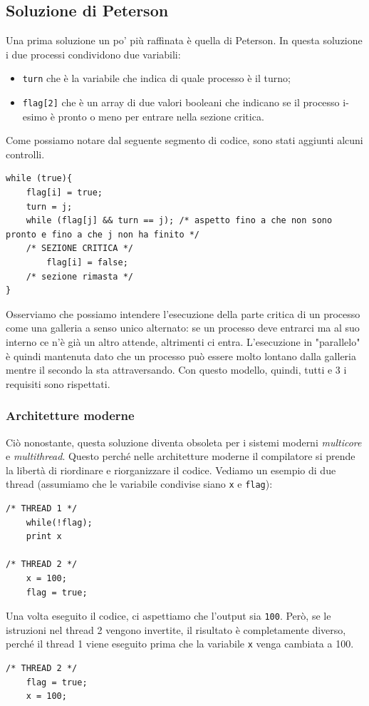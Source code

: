 \subsection{Soluzione di Peterson}
Una prima soluzione un po' più raffinata è quella di Peterson. In questa soluzione i due processi condividono due variabili:
\vspace{-5px}
\begin{itemize}
\setlength{\itemsep}{-.15 em}
    \item \texttt{turn} che è la variabile che indica di quale processo è il turno;
    \item \texttt{flag[2]} che è un array di due valori booleani che indicano se il processo i-esimo è pronto o meno per entrare nella sezione critica.
\end{itemize}

Come possiamo notare dal seguente segmento di codice, sono stati aggiunti alcuni controlli.
\begin{lstlisting}[caption={Soluzione di Peterson}]
while (true){
    flag[i] = true;
    turn = j;
    while (flag[j] && turn == j); /* aspetto fino a che non sono pronto e fino a che j non ha finito */
    /* SEZIONE CRITICA */
        flag[i] = false;
    /* sezione rimasta */
}
\end{lstlisting}
Osserviamo che possiamo intendere l'esecuzione della parte critica di un processo come una galleria a senso unico alternato: se un processo deve entrarci ma al suo interno ce n'è già un altro attende, altrimenti ci entra. L'esecuzione in "parallelo" è quindi mantenuta dato che un processo può essere molto lontano dalla galleria mentre il secondo la sta attraversando. Con questo modello, quindi, tutti e 3 i requisiti sono rispettati.
% 
\subsubsection{Architetture moderne}
Ciò nonostante, questa soluzione diventa obsoleta per i sistemi moderni \textit{multicore} e \textit{multithread}. Questo perché nelle architetture moderne il compilatore si prende la libertà di riordinare e riorganizzare il codice. Vediamo un esempio di due thread (assumiamo che le variabile condivise siano \texttt{x} e \texttt{flag}):
\begin{lstlisting}
/* THREAD 1 */
    while(!flag);
    print x

/* THREAD 2 */
    x = 100;
    flag = true;
\end{lstlisting}
Una volta eseguito il codice, ci aspettiamo che l'output sia \texttt{100}. Però, se le istruzioni nel thread 2 vengono invertite, il risultato è completamente diverso, perché il thread 1 viene eseguito prima che la variabile \texttt{x} venga cambiata a 100.
\begin{lstlisting}
/* THREAD 2 */
    flag = true;
    x = 100;
\end{lstlisting}

